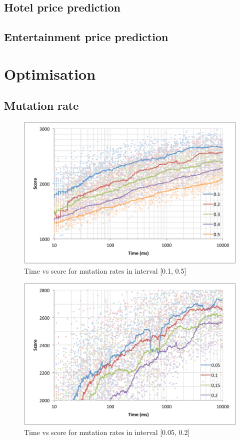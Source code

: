 \documentclass[a4paper]{proc}
\begin{document}
\subsection{Hotel price prediction}

\subsection{Entertainment price prediction}

\section{Optimisation}

\subsection{Mutation rate}

\begin{figure}
  \includegraphics[width=\linewidth]{mutation_rate_1.pdf}
  \caption{Time vs score for mutation rates in interval [0.1, 0.5]}
  \label{fig:mutation_rate_1}
\end{figure}

\begin{figure}
  \includegraphics[width=\linewidth]{mutation_rate_2.pdf}
  \caption{Time vs score for mutation rates in interval [0.05, 0.2]}
  \label{fig:mutation_rate_2}
\end{figure}
\end{document}
